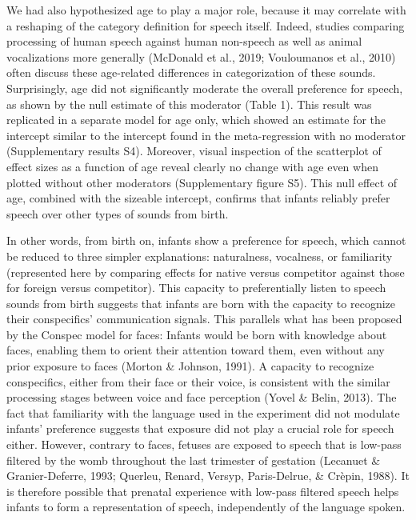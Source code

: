 \documentclass[man]{apa6}
\begin{document}
We had also hypothesized age to play a major role, because it may
correlate with a reshaping of the category definition for speech itself.
Indeed, studies comparing processing of human speech against human
non-speech as well as animal vocalizations more generally (McDonald et
al., 2019; Vouloumanos et al., 2010) often discuss these age-related
differences in categorization of these sounds. Surprisingly, age did not
significantly moderate the overall preference for speech, as shown by
the null estimate of this moderator (Table 1). This result was
replicated in a separate model for age only, which showed an estimate
for the intercept similar to the intercept found in the meta-regression
with no moderator (Supplementary results S4). Moreover, visual
inspection of the scatterplot of effect sizes as a function of age
reveal clearly no change with age even when plotted without other
moderators (Supplementary figure S5). This null effect of age, combined
with the sizeable intercept, confirms that infants reliably prefer
speech over other types of sounds from birth.

In other words, from birth on, infants show a preference for speech,
which cannot be reduced to three simpler explanations: naturalness,
vocalness, or familiarity (represented here by comparing effects for
native versus competitor against those for foreign versus competitor).
This capacity to preferentially listen to speech sounds from birth
suggests that infants are born with the capacity to recognize their
conspecifics' communication signals. This parallels what has been
proposed by the Conspec model for faces: Infants would be born with
knowledge about faces, enabling them to orient their attention toward
them, even without any prior exposure to faces (Morton \& Johnson,
1991). A capacity to recognize conspecifics, either from their face or
their voice, is consistent with the similar processing stages between
voice and face perception (Yovel \& Belin, 2013). The fact that
familiarity with the language used in the experiment did not modulate
infants' preference suggests that exposure did not play a crucial role
for speech either. However, contrary to faces, fetuses are exposed to
speech that is low-pass filtered by the womb throughout the last
trimester of gestation (Lecanuet \& Granier-Deferre, 1993; Querleu,
Renard, Versyp, Paris-Delrue, \& Crèpin, 1988). It is therefore possible
that prenatal experience with low-pass filtered speech helps infants to
form a representation of speech, independently of the language spoken.
\end{document}
